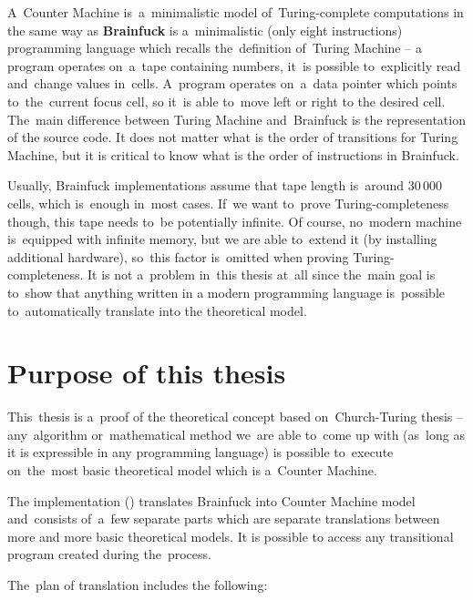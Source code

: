\documentclass[english,shortabstract,mgr]{iithesis}
\begin{document}
A~Counter Machine is~a~minimalistic model of~Turing-complete computations in the same way as
\textbf{Brainfuck} \cite{brainfuckWiki} is a~minimalistic (only eight instructions) programming
language which recalls
the~definition of~Turing Machine -- a program operates on~a~tape containing numbers, it~is possible
to~explicitly read and~change values in~cells. A~program operates on~a~data pointer which
points to~the~current focus cell, so it~is able to~move left or right to the desired cell. The~main difference
between Turing Machine and~Brainfuck is the representation of the source code.
It does not matter what is the order of transitions for Turing Machine, but it
is critical to know what is the order of instructions in Brainfuck.

Usually, Brainfuck implementations assume that tape length is~around $30\,000$ cells, which
is~enough in~most cases. If~we want to~prove Turing-completeness though, this tape
needs to~be potentially infinite. Of course, no~modern machine is~equipped with infinite memory,
but we are able to~extend it (by installing additional hardware), so~this factor is~omitted
when proving Turing-completeness. It is not a~problem in~this thesis at~all since
the~main goal is to~show that anything written in a modern programming language is~possible
to~automatically translate into the theoretical model.

\section {Purpose of this thesis}

This~thesis is a~proof of the theoretical concept based on~Church-Turing thesis -- any~algorithm
or~mathematical method we~are able to~come up with (as~long as it is expressible in any programming
language) is possible to~execute on~the~most basic theoretical model which is a~Counter Machine.

The implementation (\hspace{1sp}\cite{github}) translates Brainfuck into Counter Machine model and~consists of~a~few separate parts
which are separate translations between more and more basic theoretical models.
It is possible to access any transitional program created during the~process.

The~plan of translation includes the following:
\end{document}
